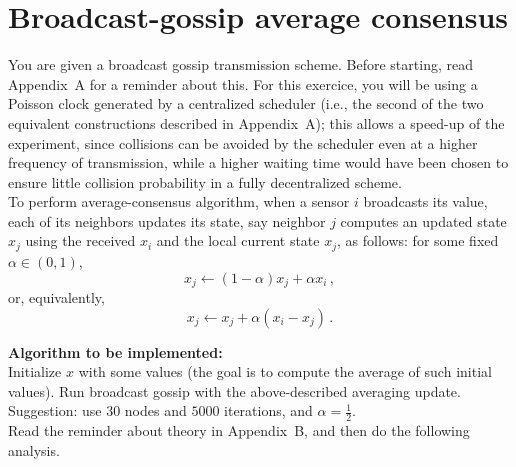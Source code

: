 \documentclass{article}
\begin{document}
\newpage
\section{Broadcast-gossip average consensus}
You are given a broadcast gossip transmission scheme. Before starting, read Appendix~A for a reminder about this.
For this exercice, you will be using a Poisson clock generated by a centralized scheduler (i.e., the second of the two equivalent constructions described in Appendix~A); this allows a speed-up of the experiment, since collisions can be avoided by the scheduler even at a higher frequency of transmission, while a higher waiting time would have been chosen to ensure little collision probability in a fully decentralized scheme.\\

To perform average-consensus algorithm, when a sensor $i$ broadcasts its value, each of its neighbors updates its state, say neighbor $j$ computes an updated state $x_j$ using the received $x_i$ and the local current state $x_j$, as follows:
 for some fixed $\alpha \in (0,1)$,
\[ x_j  \leftarrow (1- \alpha) x_j + \alpha x_i \,,\]
 or, equivalently,
\[ x_j \leftarrow x_j + \alpha (x_i-x_j) \,.\]

\textbf{Algorithm to be implemented:}\\
Initialize $x$ with some values (the goal is to compute the average of such initial values).
Run broadcast gossip with the above-described averaging update.\\
Suggestion: use $30$ nodes and $5000$ iterations, and $\alpha = \frac{1}{2}$.\\

Read the reminder about theory in Appendix~B, and then do the following analysis.\\
\end{document}
